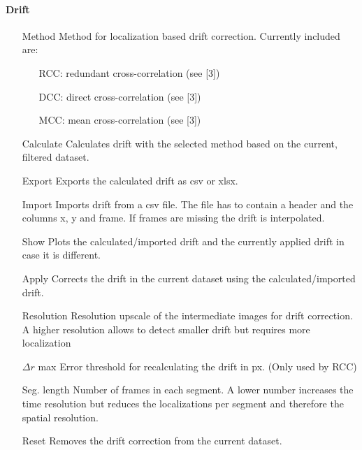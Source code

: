 \documentclass[11pt,onside]{report}
\numberwithin{equation}{chapter}
\begin{document}
\paragraph{Drift}
\begin{itemize}[leftmargin=3cm]
\item[\textsf{Method}] Method for localization based drift correction. Currently included are:
\begin{itemize}
	\item[] RCC: redundant cross-correlation (see [3])
	\item[] DCC: direct cross-correlation (see [3])
	\item[] MCC: mean cross-correlation (see [3])
\end{itemize}
\item[\textsf{Calculate}] Calculates drift with the selected method based on the current, filtered dataset.
\item[\textsf{Export}] Exports the calculated drift as \textsf{csv} or \textsf{xlsx}.
\item[\textsf{Import}] Imports drift from a \textsf{csv} file. The file has to contain a header and the columns \textsf{x}, \textsf{y} and \textsf{frame}. If frames are missing the drift is interpolated.
\item[\textsf{Show}] Plots the calculated/imported drift and the currently applied drift in case it is different.
\item[\textsf{Apply}] Corrects the drift in the current dataset using the calculated/imported drift.
\item[\textsf{Resolution}] Resolution upscale of the intermediate images for drift correction. A higher resolution allows to detect smaller drift but requires more localization
\item[\textsf{$\Delta r$ max}] Error threshold for recalculating the drift in px. (Only used by RCC)
\item[\textsf{Seg. length}] Number of frames in each segment. A lower number increases the time resolution but reduces the localizations per segment and therefore the spatial resolution.
\item[\textsf{Reset}] Removes the drift correction from the current dataset.
\end{itemize}
\end{document}
